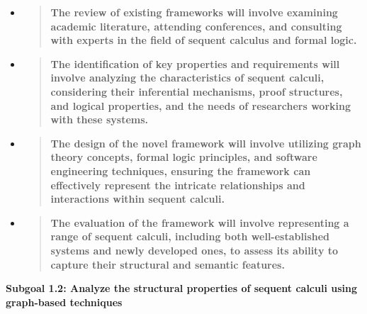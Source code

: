 \begin{itemize}
  \begin{itemize}
  \item
    \begin{quote}
    \textbf{The review of existing frameworks will involve examining
    academic literature, attending conferences, and consulting with
    experts in the field of sequent calculus and formal logic.}
    \end{quote}
  \item
    \begin{quote}
    \textbf{The identification of key properties and requirements will
    involve analyzing the characteristics of sequent calculi,
    considering their inferential mechanisms, proof structures, and
    logical properties, and the needs of researchers working with these
    systems.}
    \end{quote}
  \item
    \begin{quote}
    \textbf{The design of the novel framework will involve utilizing
    graph theory concepts, formal logic principles, and software
    engineering techniques, ensuring the framework can effectively
    represent the intricate relationships and interactions within
    sequent calculi.}
    \end{quote}
  \item
    \begin{quote}
    \textbf{The evaluation of the framework will involve representing a
    range of sequent calculi, including both well-established systems
    and newly developed ones, to assess its ability to capture their
    structural and semantic features.}
    \end{quote}
  \end{itemize}
\end{itemize}

\textbf{Subgoal 1.2: Analyze the structural properties of sequent
calculi using graph-based techniques}

